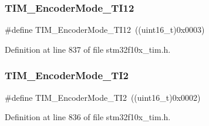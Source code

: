 \subsubsection{\texorpdfstring{T\+I\+M\+\_\+\+Encoder\+Mode\+\_\+\+T\+I12}{TIM\_EncoderMode\_TI12}}
{\footnotesize\ttfamily \#define T\+I\+M\+\_\+\+Encoder\+Mode\+\_\+\+T\+I12~((uint16\+\_\+t)0x0003)}



Definition at line 837 of file stm32f10x\+\_\+tim.\+h.

\mbox{\label{group___t_i_m___encoder___mode_ga5627a2d5d47b7301c7dbb29d20ae00e3}} 
\subsubsection{\texorpdfstring{T\+I\+M\+\_\+\+Encoder\+Mode\+\_\+\+T\+I2}{TIM\_EncoderMode\_TI2}}
{\footnotesize\ttfamily \#define T\+I\+M\+\_\+\+Encoder\+Mode\+\_\+\+T\+I2~((uint16\+\_\+t)0x0002)}



Definition at line 836 of file stm32f10x\+\_\+tim.\+h.

